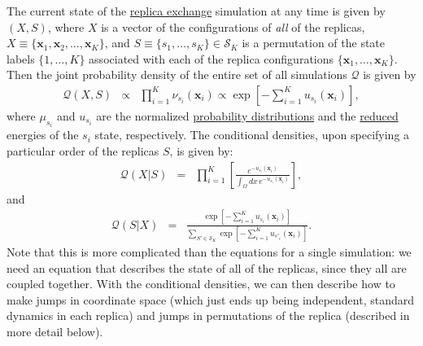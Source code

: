 \documentclass[9pt,review]{livecoms}
\newcommand{\vx}{\mathbf{x}}
\begin{document}
The current state of the \hyperlink{ref:ReplEx} {replica exchange} simulation at any time is given by $(X,S)$, where $X$ is a vector of the configurations of \emph{all} of the replicas, $X \equiv \{\vx_1, \vx_2, \ldots, \vx_K\}$, and $S \equiv\{s_1,\ldots,s_K\} \in \mathcal{S}_K$ is a permutation of the state labels $\{1, \ldots, K\}$ associated with each of the replica configurations $\{\vx_1, \ldots, \vx_K\}$. Then the joint probability density of the entire set of all simulations $\mathcal{Q}$ is given by
\begin{eqnarray}
\mathcal{Q}(X, S) &\propto& \prod_{i=1}^{K} \nu_{s_i}(\vx_i) \propto \exp\left[-\sum_{i=1}^K u_{s_i}(\vx_i)\right],
\label{eq:parallereplica}
\end{eqnarray}
where $\mu_{s_i}$ and $u_{s_i}$ are the normalized \hyperlink{ref:Distribution}{probability distributions} and the \hyperlink{ref:reduced}{reduced} energies of the $s_i$ state, respectively.
The conditional densities, upon specifying a particular order of the replicas $S$, is given by:
\begin{eqnarray}
\mathcal{Q}(X | S) &=& \prod_{i=1}^K \left[ \frac{e^{-u_{s_i}(\vx_i)}}{\int_\Omega dx \, e^{-u_{s_i}(\vx_i)}}\right],
\end{eqnarray}
and
\begin{eqnarray}
\mathcal{Q}(S | X) &=& \frac{\exp\left[- \sum\limits_{i=1}^K u_{s_i}(\vx_i) \right]}{\sum\limits_{S' \in \mathcal{S}_K} \exp\left[- \sum\limits_{i=1}^K u_{s'_i}(\vx_i) \right]}.
\end{eqnarray}
Note that this is more complicated than the equations for a single simulation: we need an equation that describes the state of all of the replicas, since they all are coupled together. With the conditional densities, we can then describe how to make jumps in coordinate space (which just ends up being independent, standard dynamics in each replica) and jumps in permutations of the replica (described in more detail below).
\end{document}
